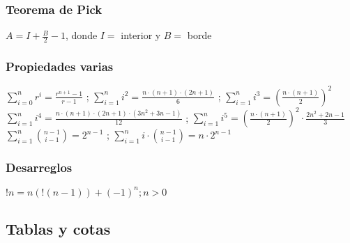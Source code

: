 \documentclass[10pt, landscape, twocolumn, a4paper, notitlepage]{article}
\begin{document}
\subsubsection{Teorema de Pick}
$A = I + \frac{B}{2} - 1$, donde $I =$ interior y $B =$ borde
%
\subsubsection{Propiedades varias}
$\sum_{i=0}^n{r^i} = \frac{r^{n+1}-1}{r-1}$ ; $\sum_{i=1}^n{i^2} = \frac{n\cdot(n+1)\cdot(2n+1)}{6}$ ;
$\sum_{i=1}^n{i^3} = \left(\frac{n\cdot(n+1)}{2}\right)^2$ \\
$\sum_{i=1}^n{i^4} = \frac{n\cdot(n+1)\cdot(2n+1)\cdot(3n^2+3n-1)}{12}$ ;
$\sum_{i=1}^{ n} i^5 = \left(\frac{ n \cdot (n+1)}{2}\right) ^2 \cdot \frac{2 n ^2 + 2n - 1}{3}$ \\
%
$\sum_{i=1}^n{\binom{n-1}{i-1}} = 2^{n-1}$ ; $\sum_{i=1}^n{i\cdot\binom{n-1}{i-1}} = n\cdot2^{n-1}$ \\
%
\subsubsection{Desarreglos}
$!n = n(!(n - 1)) + (-1)^n; n > 0$ 
\subsection{Tablas y cotas}
\end{document}
